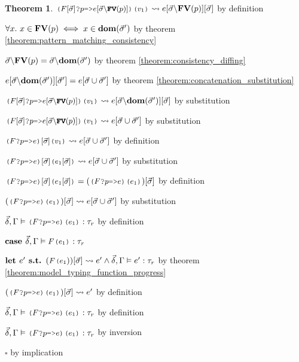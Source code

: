 \documentclass[acmsmall]{acmart}
\theoremstyle{definition}
\newtheorem{theorem}{Theorem}[section]
\begin{document}
\begin{theorem}
      \item \Z\Z $\J{($F[\vec{\sigma}]$?$p$=>$e[\vec{\sigma}\backslash\B{FV}(p)]$)($v_1$)} \rightsquigarrow e[\vec{\sigma}\backslash\B{FV}(p)][\vec{\sigma}]$ by definition 

      \item \Z\Z $\forall x .\ x \in \textbf{FV}(p) \iff x \in \textbf{dom}(\vec{\sigma}')$ 
      by theorem \ref{theorem:pattern_matching_consistency}
      \item \Z\Z $\vec{\sigma}\backslash\textbf{FV}(p) = \vec{\sigma}\backslash\textbf{dom}(\vec{\sigma}')$ 
      by theorem \ref{theorem:consistency_diffing}
      \item \Z\Z $e[\vec{\sigma}\backslash\textbf{dom}(\vec{\sigma}')][\vec{\sigma}'] = e[\vec{\sigma} \cup \vec{\sigma}']$ 
      by theorem \ref{theorem:concatenation_substitution}

      \item \Z\Z $\J{($F[\vec{\sigma}]$?$p$=>$e[\vec{\sigma}\backslash\B{FV}(p)]$)($v_1$)} \rightsquigarrow e[\vec{\sigma}\backslash\B{dom}(\vec{\sigma}')][\vec{\sigma}]$ 
        by substitution
      \item \Z\Z $\J{($F[\vec{\sigma}]$?$p$=>$e[\vec{\sigma}\backslash\B{FV}(p)]$)($v_1$)} \rightsquigarrow e[\vec{\sigma} \cup \vec{\sigma}']$ 
        by substitution 
      \item \Z\Z $\J{($F$?$p$=>$e$)$[\vec{\sigma}]$($v_1$)} \rightsquigarrow e[\vec{\sigma} \cup \vec{\sigma}']$ by definition 
      \item \Z\Z $\J{($F$?$p$=>$e$)$[\vec{\sigma}]$($e_1[\vec{\sigma}]$)} \rightsquigarrow e[\vec{\sigma} \cup \vec{\sigma}']$ by substitution  

      \item \Z\Z $\J{($F$?$p$=>$e$)$[\vec{\sigma}]$($e_1[\vec{\sigma}]$)} = (\J{($F$?$p$=>$e$)($e_1$)})[\vec{\sigma}]$ by definition  
      \item \Z\Z $(\J{($F$?$p$=>$e$)($e_1$)})[\vec{\sigma}] \rightsquigarrow e[\vec{\sigma} \cup \vec{\sigma}']$ by substitution  

      \item \Z\Z $\vec{\delta}, \Gamma \satisfies \J{($F$?$p$=>$e$)($e_1$)} \hastype \tau_r$ by definition

    \item \Z $\B{case } \vec{\delta}, \Gamma \satisfies \J{$F$($e_1$)} \hastype \tau_r$ 
      \item \Z\Z $\B{let } e' \B{ s.t. } (\J{$F$($e_1$}))[\vec{\sigma}] \rightsquigarrow e' \land \vec{\delta}, \Gamma \satisfies e' \hastype \tau_r$ by theorem \ref{theorem:model_typing_function_progress}
      \item \Z\Z $(\J{($F$?$p$=>$e$)($e_1$)})[\vec{\sigma}] \rightsquigarrow e'$ by definition 
      \item \Z\Z $\vec{\delta}, \Gamma \satisfies \J{($F$?$p$=>$e$)($e_1$)} \hastype \tau_r$ by definition
    \item \Z $\vec{\delta}, \Gamma \satisfies \J{($F$?$p$=>$e$)($e_1$)} \hastype \tau_r$ by inversion 
  \item $\square$ by implication
\end{theorem}
\end{document}
